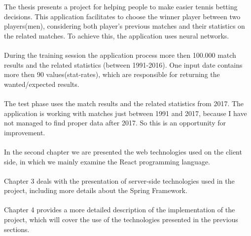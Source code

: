 \documentclass[final]{ubb_dolgozat}
\author{%
Lázár Szilárd
}
\begin{document}
\begin{abstractEN} %


The thesis presents a project for helping people to make easier tennis betting decisions. This application facilitates to choose the winner player between two players(men),  considering both player's previous matches and their statistics on the related matches. To achieve this, the application uses neural networks. 
\paragraph{}
During the training session the application process more then 100.000 match results and the related statistics (between 1991-2016). One input date contains more then 90 values(stat-rates), which are responsible for returning the wanted/expected results.

\paragraph{}
The test phase uses the match results and the related statistics from 2017. The application is working with matches just between 1991 and 2017, because I have not managed to find proper data after 2017. So this is an opportunity for improvement.

\paragraph{}
In the second chapter we are presented the web technologies used on the client side, in which we mainly examine the React programming language. 

\paragraph{}
Chapter 3 deals with the presentation of server-side technologies used in the project, including more details about the Spring Framework. 

\paragraph{}
Chapter 4 provides a more detailed description of the implementation of the project, which will cover the use of the technologies presented in the previous sections.


\end{abstractEN}
\end{document}
